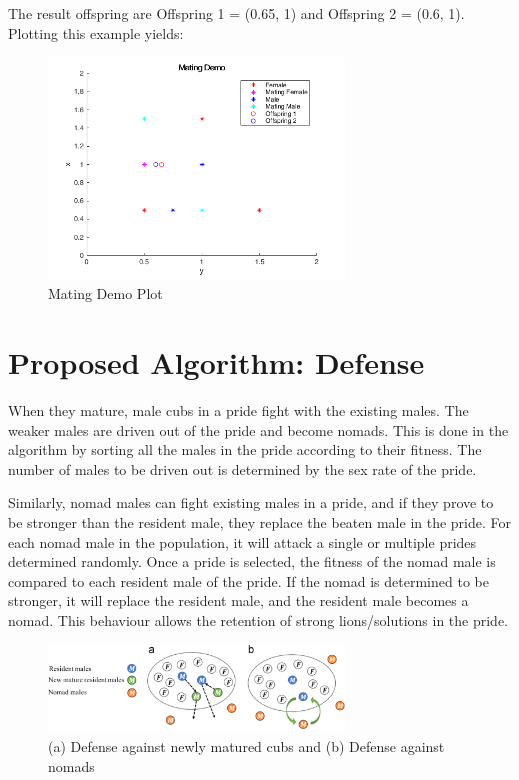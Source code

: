 The result offspring are Offspring 1 = (0.65, 1) and Offspring 2 = (0.6, 1). Plotting this example yields:
\begin{figure}[H]
\begin{center}
\includegraphics[width=0.7\textwidth]{img/mating/matingdemooutput}
\caption{Mating Demo Plot}
\end{center}
\end{figure}

\section{Proposed Algorithm: Defense}
When they mature, male cubs in a pride fight with the existing males. The weaker males are driven out of the pride and become nomads. This is done in the algorithm by sorting all the males in the pride according to their fitness. The number of males to be driven out is determined by the sex rate of the pride.

Similarly, nomad males can fight existing males in a pride, and if they prove to be stronger than the resident male, they replace the beaten male in the pride. For each nomad male in the population, it will attack a single or multiple prides determined randomly. Once a pride is selected, the fitness of the nomad male is compared to each resident male of the pride. If the nomad is determined to be stronger, it will replace the resident male, and the resident male becomes a nomad. This behaviour allows the retention of strong lions/solutions in the pride.

\begin{figure}[H]
\begin{center}
\includegraphics[width=0.7\textwidth]{img/defense/defense}
\caption{(a) Defense against newly matured cubs and (b) Defense against nomads}
\end{center}
\end{figure}

